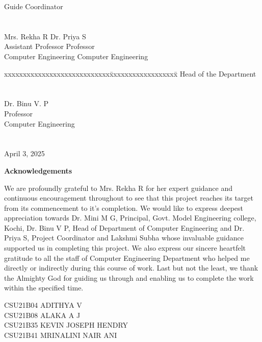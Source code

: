 \documentclass[11pt]{report}
\begin{document}
\begin{titlepage}
\begin{tabbing}
			Guide			\>				Coordinator
			\\
			\\
			\\
			Mrs. Rekha R \> Dr. Priya S\\
			Assistant Professor	\> Professor\\
			Computer Engineering	\>	Computer Engineering
		\end{tabbing}
		\vspace{.08in}
		\begin{tabbing}
			xxxxxxxxxxxxxxxxxxxxxxxxxxxx\= xxxxxxxxxxxxxxxxxx\= \kill
			\>Head of the Department \\
			\\
			\\
			\>Dr. Binu V. P\\
			\>Professor\\
			\>Computer Engineering\\
                \\
                \\
                \>April 3, 2025
		\end{tabbing}
	\end{titlepage}
		
\begin{center}
\thispagestyle{empty}        
    \LARGE{\textbf{Acknowledgements}}\\[1cm]
\end{center}
\linespread{1.13}
\par We are profoundly grateful to Mrs. Rekha R for her expert guidance and continuous encouragement throughout to see that this project reaches its target from its commencement to it's completion. We would like to express deepest appreciation towards Dr. Mini M G, Principal, Govt. Model Engineering college, Kochi,  Dr. Binu V P, Head of Department of Computer Engineering and Dr. Priya S, Project Coordinator and Lakshmi Subha whose invaluable guidance supported us in completing this project. We also express our sincere heartfelt gratitude to all the staff of Computer Engineering Department who helped me directly or indirectly during this course of work. Last but not the least, we thank the Almighty God for guiding us through and enabling us to complete the work within the specified time.

\begin{flushleft}
    {
	CSU21B04 ADITHYA V
	\\CSU21B08 ALAKA A J
	\\CSU21B35 KEVIN JOSEPH HENDRY
	\\CSU21B41 MRINALINI NAIR ANI
    }
\end{flushleft}
\newpage
\end{document}
